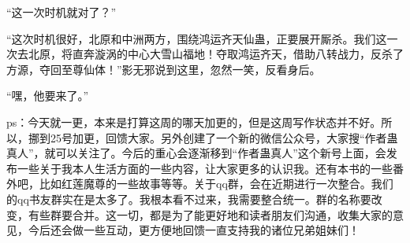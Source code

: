 \begin{this_body}
“这一次时机就对了？”

“这次时机很好，北原和中洲两方，围绕鸿运齐天仙蛊，正要展开厮杀。我们这一次去北原，将直奔漩涡的中心大雪山福地！夺取鸿运齐天，借助八转战力，反杀了方源，夺回至尊仙体！”影无邪说到这里，忽然一笑，反看身后。

“嘿，他要来了。”

ps：今天就一更，本来是打算这周的哪天加更的，但是这周写作状态并不好。所以，挪到25号加更，回馈大家。另外创建了一个新的微信公众号，大家搜“作者蛊真人”，就可以关注了。今后的重心会逐渐移到“作者蛊真人”这个新号上面，会发布一些关于我本人生活方面的一些内容，让大家更多的认识我。还有本书的一些番外吧，比如红莲魔尊的一些故事等等。关于qq群，会在近期进行一次整合。我们的qq书友群实在是太多了。我根本看不过来，我需要整合统一。群的名称要改变，有些群要合并。这一切，都是为了能更好地和读者朋友们沟通，收集大家的意见，今后还会做一些互动，更方便地回馈一直支持我的诸位兄弟姐妹们！

\end{this_body}

